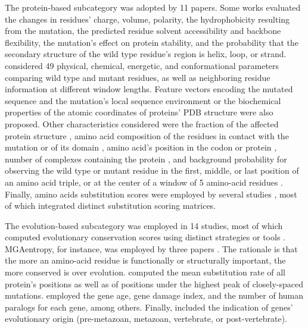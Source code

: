 The protein-based subcategory was adopted by 11 papers. Some works \cite{Carter2009, Tan2012, Mao2013} evaluated the changes in residues' charge, volume, polarity, the hydrophobicity resulting from the mutation, the predicted residue solvent accessibility and backbone flexibility, the mutation's effect on protein stability, and the probability that the secondary structure of the wild type residue's region is helix, loop, or strand. \citet{Anoosha2015} considered 49 physical, chemical, energetic, and conformational parameters comparing wild type and mutant residues, as well as neighboring residue information at different window lengths. Feature vectors encoding the mutated sequence and the mutation's local sequence environment \cite{Capriotti2011} or the biochemical properties of the atomic coordinates of proteins' PDB structure \cite{Tavanaei2017} were also proposed. Other characteristics considered were the fraction of the affected protein structure \cite{Zhou2018}, amino acid composition of the residues in contact with the mutation or of its domain \cite{Zhou2018}, amino acid's position in the codon or protein \cite{Agajanian2019}, number of complexes containing the protein \cite{Nulsen2021}, and background probability for observing the wild type or mutant residue in the first, middle, or last position of an amino acid triple, or at the center of a window of 5 amino-acid residues \cite{Carter2009, Tan2012}. Finally, amino acids substitution scores were employed by several studies \cite{Carter2009, Tan2012, Mao2013, U2014, Anoosha2015}, most of which integrated distinct substitution scoring matrices. 


The evolution-based subcategory was employed in 14 studies, most of which computed evolutionary conservation scores using distinct strategies or tools \cite{Carter2009, Capriotti2011, Mao2013, U2014, Anoosha2015, Tokheim2016, Agajanian2018, Zhou2018, Agajanian2019, Colaprico2020, Lyu2020}. MGAentropy, for instance, was employed by three papers \cite{Mao2013,Tokheim2016, Lyu2020}. The rationale is that the more an amino-acid residue is functionally or structurally important, the more conserved is over evolution. \citet{Chandrashekar2020} computed the mean substitution rate of all protein's positions as well as of positions under the highest peak of closely-spaced mutations. \citet{Lyu2020} employed the gene age, gene damage index, and the number of human paralogs for each gene, among others. Finally, \citet{Nulsen2021} included the indication of genes' evolutionary origin (\ie pre-metazoan, metazoan, vertebrate, or post-vertebrate).

